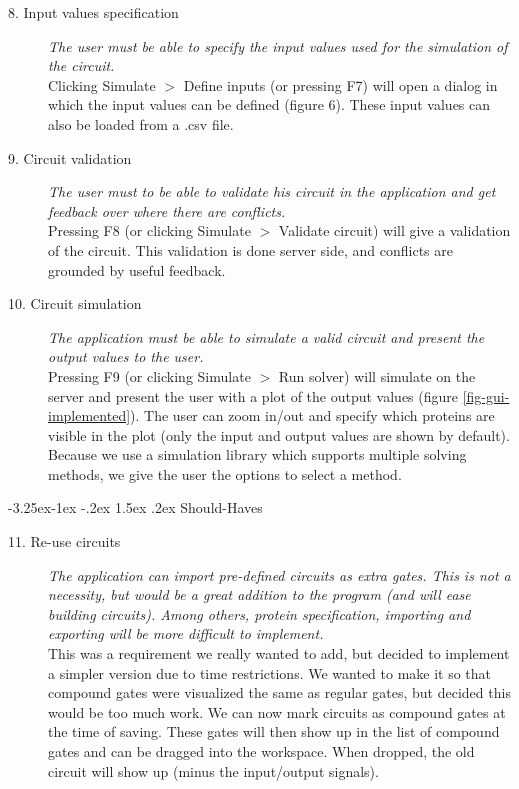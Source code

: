 \documentclass[a4paper]{article}
\makeatletter
\renewcommand\paragraph{\@startsection{paragraph}{4}{\z@}%
  {-3.25ex\@plus -1ex \@minus -.2ex}%
  {1.5ex \@plus .2ex}%
  {\normalfont\normalsize\bfseries}}
\makeatother
\begin{document}
\begin{description}
\item[8. Input values specification] \textit{The user must be able to specify the input values used for the simulation of the circuit.}\\
Clicking Simulate $>$ Define inputs (or pressing F7) will open a dialog in which the input values can be defined (figure 6). These input values can also be loaded from a .csv file.

\item[9. Circuit validation] \textit{The user must to be able to validate his circuit in the application and get feedback over where there are conflicts.}\\
Pressing F8 (or clicking Simulate $>$ Validate circuit) will give a validation of the circuit. This validation is done server side, and conflicts are grounded by useful feedback.

\item[10. Circuit simulation] \textit{The application must be able to simulate a valid circuit and present the output values to the user.}\\
Pressing F9 (or clicking Simulate $>$ Run solver) will simulate on the server and present the user with a plot of the output values (figure \ref{fig-gui-implemented}). The user can zoom in/out and specify which proteins are visible in the plot (only the input and output values are shown by default). Because we use a simulation library which supports multiple solving methods, we give the user the options to select a method.
\end{description}

\paragraph{Should-Haves}
\begin{description}
\item[11. Re-use circuits] \textit{The application can import pre-defined circuits as extra gates. This is not a necessity, but would be a great addition to the program (and will ease building circuits). Among others, protein specification, importing and exporting will be more difficult to implement.}\\
This was a requirement we really wanted to add, but decided to implement a simpler version due to time restrictions. We wanted to make it so that compound gates were visualized the same as regular gates, but decided this would be too much work. We can now mark circuits as compound gates at the time of saving. These gates will then show up in the list of compound gates and can be dragged into the workspace. When dropped, the old circuit will show up (minus the input/output signals).
\end{description}
\end{document}
